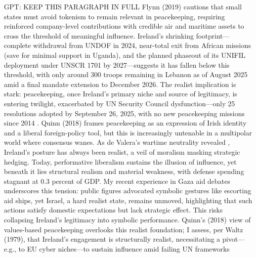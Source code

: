 GPT: KEEP THIS PARAGRAPH IN FULL Flynn (2019)\nocite{FLYNN_2019} cautions that small states must avoid tokenism to remain relevant in peacekeeping, requiring reinforced company-level contributions with credible air and maritime assets to cross the threshold of meaningful influence. Ireland’s shrinking footprint—complete withdrawal from UNDOF in 2024, near-total exit from African missions (save for minimal support in Uganda), and the planned phaseout of its UNIFIL deployment under UNSCR 1701 by 2027—suggests it has fallen below this threshold, with only around 300 troops remaining in Lebanon as of August 2025 amid a final mandate extension to December 2026. The realist implication is stark: peacekeeping, once Ireland’s primary niche and source of legitimacy, is entering twilight, exacerbated by UN Security Council dysfunction—only 25 resolutions adopted by September 26, 2025, with no new peacekeeping missions since 2014 \parencite{HELLMUELLER_2024}. Quinn (2018) \nocite{QUINN_2018} frames peacekeeping as an expression of Irish identity and a liberal foreign-policy tool, but this is increasingly untenable in a multipolar world where consensus wanes. As de Valera’s wartime neutrality revealed \parencite{FANNING_2015,AYIOTIS_2023}, Ireland’s posture has always been realist, a veil of moralism masking strategic hedging. Today, performative liberalism sustains the illusion of influence, yet beneath it lies structural realism and material weakness, with defense spending stagnant at 0.3 percent of GDP. My recent experience in Gaza aid debates underscores this tension: public figures advocated symbolic gestures like escorting aid ships, yet Israel, a hard realist state, remains unmoved, highlighting that such actions satisfy domestic expectations but lack strategic effect. This risks collapsing Ireland’s legitimacy into symbolic performance. Quinn’s (2018) view of values-based peacekeeping overlooks this realist foundation; I assess, per Waltz (1979), \nocite{WALTZ_1979}that Ireland’s engagement is structurally realist, necessitating a pivot—e.g., to EU cyber niches—to sustain influence amid failing UN frameworks

